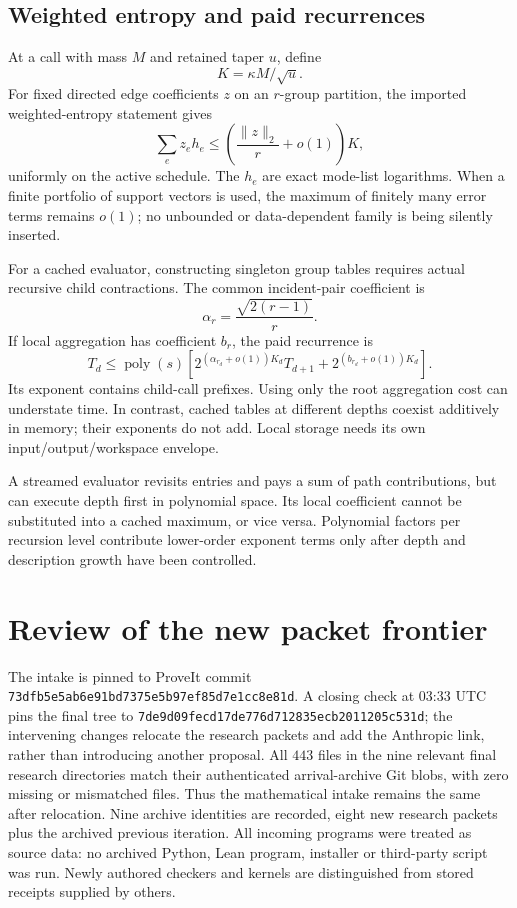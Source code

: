 \documentclass[11pt,letterpaper]{article}
\theoremstyle{remark}\newtheorem{remark}[theorem]{Remark}
\newcommand{\poly}{\operatorname{poly}}\newcommand{\vTwo}{v_2}\newcommand{\ceil}[1]{\left\lceil#1\right\rceil}\newcommand{\floor}[1]{\left\lfloor#1\right\rfloor}\newcommand{\LL}{\mathcal L}
\newcommand{\Pin}{73dfb5e5ab6e91bd7375e5b97ef85d7e1cc8e81d}
\newcommand{\ClosingPin}{7de9d09fecd17de776d712835ecb2011205c531d}
\begin{document}
\subsection{Weighted entropy and paid recurrences}
At a call with mass $M$ and retained taper $u$, define
\[
 K=\kappa M/\sqrt u.
\]
For fixed directed edge coefficients $z$ on an $r$-group partition, the imported weighted-entropy statement gives
\begin{equation}\label{eq:entropy}
 \sum_e z_eh_e\le\left(\frac{\|z\|_2}{r}+o(1)\right)K,
\end{equation}
uniformly on the active schedule. The $h_e$ are exact mode-list logarithms. When a finite portfolio of support vectors is used, the maximum of finitely many error terms remains $o(1)$; no unbounded or data-dependent family is being silently inserted.

For a cached evaluator, constructing singleton group tables requires actual recursive child contractions. The common incident-pair coefficient is
\[
 \alpha_r=\frac{\sqrt{2(r-1)}}r.
\]
If local aggregation has coefficient $b_r$, the paid recurrence is
\begin{equation}\label{eq:paid}
 T_d\le\poly(s)\left[
 2^{(\alpha_{r_d}+o(1))K_d}T_{d+1}
 +2^{(b_{r_d}+o(1))K_d}\right].
\end{equation}
Its exponent contains child-call prefixes. Using only the root aggregation cost can understate time. In contrast, cached tables at different depths coexist additively in memory; their exponents do not add. Local storage needs its own input/output/workspace envelope.

A streamed evaluator revisits entries and pays a sum of path contributions, but can execute depth first in polynomial space. Its local coefficient cannot be substituted into a cached maximum, or vice versa. Polynomial factors per recursion level contribute lower-order exponent terms only after depth and description growth have been controlled.

\section{Review of the new packet frontier}
\label{sec:review}
The intake is pinned to ProveIt commit \texttt{\Pin}. A closing check at 03:33 UTC pins the final tree to \texttt{\ClosingPin}; the intervening changes relocate the research packets and add the Anthropic link, rather than introducing another proposal. All $443$ files in the nine relevant final research directories match their authenticated arrival-archive Git blobs, with zero missing or mismatched files. Thus the mathematical intake remains the same after relocation. \cite{proveit} Nine archive identities are recorded, eight new research packets plus the archived previous iteration. All incoming programs were treated as source data: no archived Python, Lean program, installer or third-party script was run. Newly authored checkers and kernels are distinguished from stored receipts supplied by others.
\end{document}
